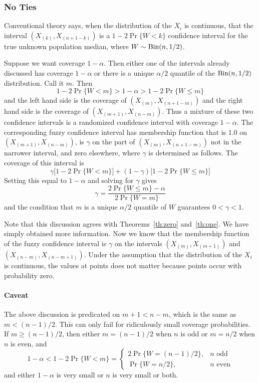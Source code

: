 \documentclass{article}
\newcommand{\BinomialDis}{\text{\upshape Bin}}
\begin{document}
\subsubsection{No Ties}

Conventional theory says, when the distribution of the $X_i$ is continuous,
that the interval $(X_{(k)}, X_{(n + 1 - k)})$ is a
$1 - 2 \Pr\{ W < k \}$ confidence interval for the true unknown population
median, where $W \sim \BinomialDis(n, 1 / 2)$.

Suppose we want coverage $1 - \alpha$.  Then either one of the intervals
already discussed has coverage $1 - \alpha$ or there is a unique
$\alpha / 2$ quantile of the $\BinomialDis(n, 1 / 2)$ distribution.
Call it $m$.  Then
$$
   1 - 2 \Pr \{ W < m \} > 1 - \alpha > 1 - 2 \Pr \{ W \le m \}
$$
and the left hand side is the coverage of $(X_{(m)}, X_{(n + 1 - m)})$
and the right hand side is the coverage of $(X_{(m + 1)}, X_{(n - m)})$.
Thus a mixture of these two confidence intervals is a randomized confidence
interval with coverage $1 - \alpha$.  The corresponding fuzzy confidence
interval has membership function that is 1.0 on $(X_{(m + 1)}, X_{(n - m)})$,
is $\gamma$ on the part
of $(X_{(m)}, X_{(n + 1 - m)})$ not in the narrower interval,
and zero elsewhere, where $\gamma$ is determined as follows.
The coverage of this interval is
$$
   \gamma  \bigl[ 1 - 2 \Pr \{ W < m \} \bigr]
   + (1 - \gamma) \bigl[ 1 - 2 \Pr \{ W \le m \} \bigr]
$$
Setting this equal to $1 - \alpha$ and solving for $\gamma$ gives
\begin{equation} \label{gamma}
   \gamma = \frac{2 \Pr \{ W \le m \} - \alpha}{2 \Pr \{ W = m \}}
\end{equation}
and
the condition that $m$ is a unique $\alpha / 2$ quantile of $W$ guarantees
$0 < \gamma < 1$.

Note that this discussion agrees with Theorems~\ref{th:zero} and~\ref{th:one}.
We have simply obtained more information.  Now we know that the membership
function of the fuzzy confidence interval is $\gamma$ on the intervals
$(X_{(m)}, X_{(m + 1)})$ and $(X_{(n - m)}, X_{(n - m + 1)})$.
Under the assumption that the distribution of the $X_i$ is continuous,
the values at points does not matter because points occur with probability
zero.

\paragraph{Caveat} The above discussion is predicated on $m + 1 < n - m$,
which is the same as $m < (n - 1) / 2$.  This can only fail for ridiculously
small coverage probabilities.  If $m \ge (n - 1) / 2$, then either
$m = (n - 1) / 2$ when $n$ is odd or $m = n / 2$ when $n$ is even, and
$$
   1 - \alpha < 1 - 2 \Pr\{ W < m \}
   =
   \begin{cases}
   2 \Pr\{ W = (n - 1) / 2 \}, & \text{$n$ odd}
   \\
   \Pr\{ W = n / 2 \}, & \text{$n$ even}
   \end{cases}
$$
and either $1 - \alpha$ is very small or $n$ is very small or both.
\end{document}
